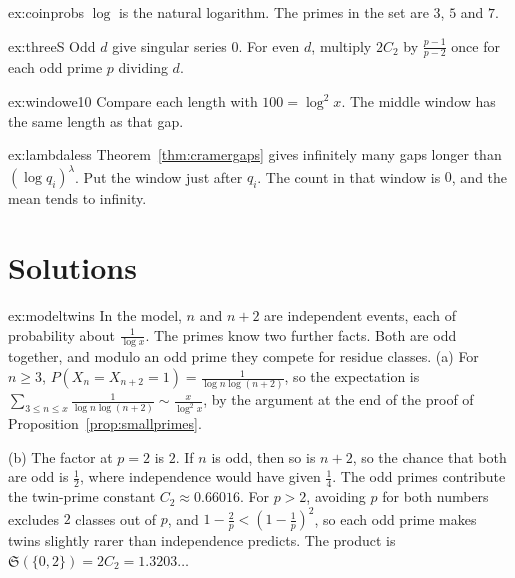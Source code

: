 \begin{hint}{ex:coinprobs}
$\log$ is the natural logarithm. The primes in the set are $3$, $5$ and $7$.
\end{hint}
\begin{hint}{ex:threeS}
Odd $d$ give singular series $0$. For even $d$, multiply $2C_2$ by $\frac{p-1}{p-2}$ once for each odd prime $p$ dividing $d$.
\end{hint}
\begin{hint}{ex:windowe10}
Compare each length with $100=\log^2 x$. The middle window has the same length as that gap.
\end{hint}
\begin{hint}{ex:lambdaless}
Theorem~\ref{thm:cramergaps} gives infinitely many gaps longer than $(\log q_i)^\lambda$. Put the window just after $q_i$. The count in that window is $0$, and the mean tends to infinity.
\end{hint}

\section{Solutions}

\begin{solution}{ex:modeltwins}
\idea In the model, $n$ and $n+2$ are independent events, each of probability about $\frac1{\log x}$. The primes know two further facts. Both are odd together, and modulo an odd prime they compete for residue classes.
\writeup (a) For $n\ge3$, $P(X_n=X_{n+2}=1)=\frac1{\log n\log(n+2)}$, so the expectation is $\sum_{3\le n\le x}\frac1{\log n\log(n+2)}\sim\frac x{\log^2x}$, by the argument at the end of the proof of
Proposition~\ref{prop:smallprimes}.

(b) The factor at $p=2$ is $2$. If $n$ is odd, then so is $n+2$, so the chance that both are odd is $\frac12$, where independence would have given $\frac14$. The odd primes contribute the twin-prime constant $C_2\approx0.66016$. For $p>2$, avoiding $p$ for both numbers excludes $2$ classes out of $p$, and $1-\frac2p<(1-\frac1p)^2$, so each odd prime makes twins slightly rarer than independence predicts. The product is $\mathfrak S(\{0,2\})=2C_2=1.3203\ldots$
\end{solution}

